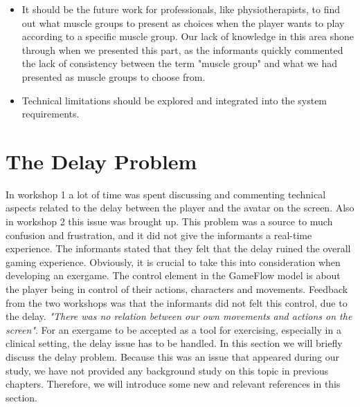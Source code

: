 \begin{itemize}
\item It should be the future work for professionals, like physiotherapists, to find out what muscle groups to present as choices when the player wants to play according to a specific muscle group. Our lack of knowledge in this area shone through when we presented this part, as the informants quickly commented the lack of consistency between the term "muscle group" and what we had presented as muscle groups to choose from. 
\item Technical limitations should be explored and integrated into the system requirements.
\end{itemize}
 
\section{The Delay Problem}
\label{sec:delay}
In workshop 1 a lot of time was spent discussing and commenting technical aspects related to the delay between the player and the avatar on the screen.  Also in workshop 2 this issue was brought up. This problem was a source to much confusion and frustration, and it did not give the informants a real-time experience. The informants stated that they felt that the delay ruined the overall gaming experience. Obviously, it is crucial to take this into consideration when developing an exergame. The control element in the GameFlow model \cite{sweetser} is about the player being in control of their actions, characters and movements. Feedback from the two workshops was that the informants did not felt this control, due to the delay. \emph{"There was no relation between our own movements and actions on the screen"}. For an exergame to be accepted as a tool for exercising, especially in a clinical setting, the delay issue has to be handled. In this section we will briefly discuss the delay problem. Because this was an issue that appeared during our study, we have not provided any background study on this topic in previous chapters. Therefore, we will introduce some new and relevant references in this section.


